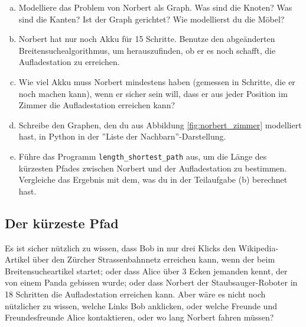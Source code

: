 \begin{aufgabe}\label{aufgabe_norbert}
\begin{enumerate}[(a)]
\item Modelliere das Problem von Norbert als Graph. Was sind die Knoten? Was sind die Kanten? Ist der Graph gerichtet? Wie modellierst du die Möbel?
\item Norbert hat nur noch Akku für 15 Schritte. Benutze den abgeänderten Breitensuchealgorithmus, um herauszufinden, ob er es noch schafft, die Aufladestation zu erreichen.
\item Wie viel Akku muss Norbert mindestens haben (gemessen in Schritte, die er noch machen kann), wenn er sicher sein will, dass er aus jeder Position im Zimmer die Aufladestation erreichen kann?
\item Schreibe den Graphen, den du aus Abbildung \ref{fig:norbert_zimmer} modelliert hast, in Python in der ''Liste der Nachbarn''-Darstellung.
\item Führe das Programm \texttt{length\_shortest\_path} aus, um die Länge des kürzesten Pfades zwischen Norbert und der Aufladestation zu bestimmen. Vergleiche das Ergebnis mit dem, was du in der Teilaufgabe (b) berechnet hast.
\end{enumerate}
\end{aufgabe}



\subsection{Der kürzeste Pfad}
Es ist sicher nützlich zu wissen, dass Bob in nur drei Klicks den Wikipedia-Artikel über den Zürcher Strassenbahnnetz erreichen kann, wenn der beim Breitensucheartikel startet; oder dass Alice über 3 Ecken jemanden kennt, der von einem Panda gebissen wurde; oder dass Norbert der Staubsauger-Roboter in 18 Schritten die Aufladestation erreichen kann. Aber wäre es nicht noch nützlicher zu wissen, welche Links Bob anklicken, oder welche Freunde und Freundesfreunde Alice kontaktieren, oder wo lang Norbert fahren müssen?

